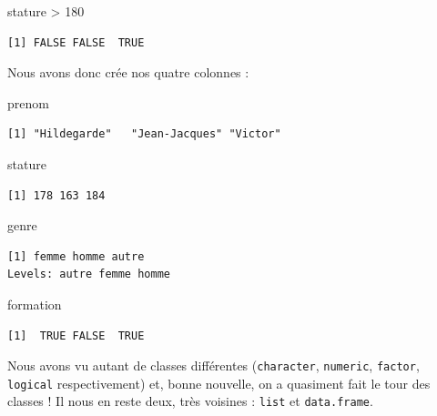 \documentclass[
  letterpaper,
  DIV=11,
  numbers=noendperiod]{scrreprt}
\newenvironment{Shaded}{\begin{snugshade}}{\end{snugshade}}
\newcommand{\DecValTok}[1]{\textcolor[rgb]{0.68,0.00,0.00}{#1}}
\newcommand{\NormalTok}[1]{\textcolor[rgb]{0.00,0.23,0.31}{#1}}
\newcommand{\SpecialCharTok}[1]{\textcolor[rgb]{0.37,0.37,0.37}{#1}}
\begin{document}
\begin{Shaded}
\begin{Highlighting}[]
\NormalTok{stature }\SpecialCharTok{\textgreater{}} \DecValTok{180}
\end{Highlighting}
\end{Shaded}

\begin{verbatim}
[1] FALSE FALSE  TRUE
\end{verbatim}

Nous avons donc crée nos quatre colonnes :

\begin{Shaded}
\begin{Highlighting}[]
\NormalTok{prenom}
\end{Highlighting}
\end{Shaded}

\begin{verbatim}
[1] "Hildegarde"   "Jean-Jacques" "Victor"      
\end{verbatim}

\begin{Shaded}
\begin{Highlighting}[]
\NormalTok{stature}
\end{Highlighting}
\end{Shaded}

\begin{verbatim}
[1] 178 163 184
\end{verbatim}

\begin{Shaded}
\begin{Highlighting}[]
\NormalTok{genre}
\end{Highlighting}
\end{Shaded}

\begin{verbatim}
[1] femme homme autre
Levels: autre femme homme
\end{verbatim}

\begin{Shaded}
\begin{Highlighting}[]
\NormalTok{formation}
\end{Highlighting}
\end{Shaded}

\begin{verbatim}
[1]  TRUE FALSE  TRUE
\end{verbatim}

Nous avons vu autant de classes différentes (\texttt{character},
\texttt{numeric}, \texttt{factor}, \texttt{logical} respectivement) et,
bonne nouvelle, on a quasiment fait le tour des classes ! Il nous en
reste deux, très voisines : \texttt{list} et \texttt{data.frame}.
\end{document}
